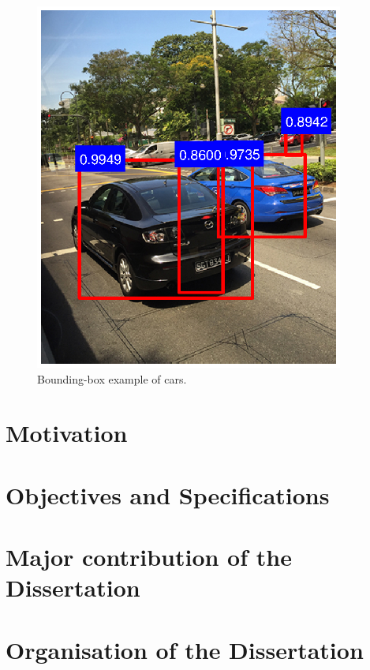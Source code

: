 \begin{spacing}{1.5}
\begin{figure}[ht]
\centering
\includegraphics[width=4in, fbox]{Chapter1/boundingbox.eps}
\caption{Bounding-box example of cars.}
\label{fig:boundingboxexample} 
\end{figure}


\section{Motivation}


\section{Objectives and Specifications}



\section{Major contribution of the Dissertation}



\section{Organisation of the Dissertation}


\end{spacing}
\newpage


